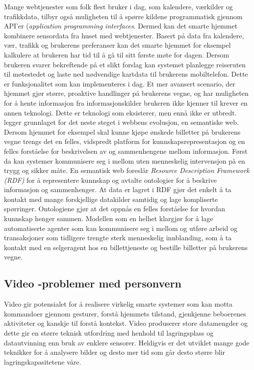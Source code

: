 {Mange webtjenester som folk flest bruker i dag, som kalendere, værkilder og trafikkdata, tilbyr også muligheten til å spørre kildene programmatisk gjennom API'er (\emph{application programming interfaces}. Dermed kan det smarte hjemmet kombinere sensordata fra huset med webtjenester. Basert på data fra kalendere, vær, trafikk og brukerens preferanser kan det smarte hjemmet for eksempel kalkulere at brukeren har tid til å gå til sitt første møte for dagen. Dersom brukeren svarer bekreftende på et slikt forslag kan systemet planlegge reiseruten til møtestedet og laste ned nødvendige kartdata til brukerens mobiltelefon. Dette er funksjonalitet som kan implementeres i dag. Et mer avansert scenario, der hjemmet gjør større, proaktive handlinger på brukerens vegne, og har muligheten for å hente informasjon fra informasjonskilder brukeren ikke kjenner til krever en annen teknologi. Dette er teknologi som eksisterer, men ennå ikke er utbredt. \citet{semantic01} legger grunnlaget for det neste steget i webbens evolusjon, en semantiske web. Dersom hjemmet for eksempel skal kunne kjøpe ønskede billetter på brukerens vegne trengs det en felles, vidspredt platform for kunnskapsrepresentasjon og en felles forståelse for beskrivelsen av og sammenhengene mellom informasjon. Først da kan systemer kommunisere seg i mellom uten menneskelig intervensjon på en trygg og sikker måte. En semantisk web foreslår \emph{Resource Description Framework (RDF)} for å representere kunnskap og avtalte ontologier for å beskrive informasjon og sammenhenger. At data er lagret i RDF gjør det enkelt å ta kontakt med mange forskjellige datakilder samtidig og lage kompliserte spørringer. Ontologiene gjør at det oppnås en felles forståelse for hvordan kunnskap henger sammen. Modellen som en helhet klargjør for å lage automatiserte agenter som kan kommunisere seg i mellom og utføre arbeid og transaksjoner som tidligere trengte sterk menneskelig innblanding, som å ta kontakt med en selgeragent hos en billettjeneste og bestille billetter på brukerens vegne.

\subsection*{Video -problemer med personvern}
Video gir potensialet for å realisere virkelig smarte systemer som kan motta kommandoer gjennom gesturer, forstå hjemmets tilstand, gjenkjenne beboerenes aktiviteter og kanskje til forstå kontekst. Video produserer store datamengder og dette gir en større teknisk utfordring med henhold til lagringsplass og datautvinning enn bruk av enklere sensorer. Heldigvis er det utviklet mange gode teknikker for å analysere bilder og desto mer tid som går desto større blir lagringskapasitetene våre.

}
